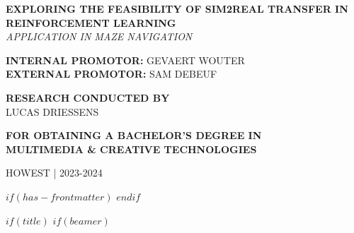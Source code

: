 \documentclass[12pt]{article}
\begin{document}
\begin{titlepage}
    \begin{adjustwidth}{1.5cm}{1.5cm}

    \MakeUppercase{\huge\textbf{Exploring the Feasibility of Sim2Real Transfer in Reinforcement Learning}} \\
    \MakeUppercase{\Large\textit{Application in Maze Navigation}}

    \vspace{1.25em}

    \noindent\MakeUppercase{\large\textbf{Internal promotor:}\large{ Gevaert Wouter}} \\
    \MakeUppercase{\large\textbf{External promotor:}\large{ Sam Debeuf}}

    \vspace{1.25em}

    \noindent\MakeUppercase{\large\textbf{Research conducted by}} \\
    \MakeUppercase{\Large{Lucas Driessens}}

    \vspace{1.25em}

    \noindent\MakeUppercase{\large\textbf{for obtaining a bachelor's degree in}} \\
    \MakeUppercase{\Large\textbf{Multimedia \& Creative Technologies}}

    \vspace{0.75em}

    \noindent\MakeUppercase{\large{Howest | 2023-2024}}

    \end{adjustwidth}
    \restoregeometry
    \normalfont
\end{titlepage}

\pagebreak
\thispagestyle{empty}
\mbox{}
\pagebreak

\renewcommand{\familydefault}{\rmdefault}
\setmainfont{TeX Gyre Pagella} %
\fontsize{11pt}{14pt}\selectfont



$if(has-frontmatter)$
$endif$

$if(title)$
$if(beamer)$
\frame{\titlepage}
\end{document}
